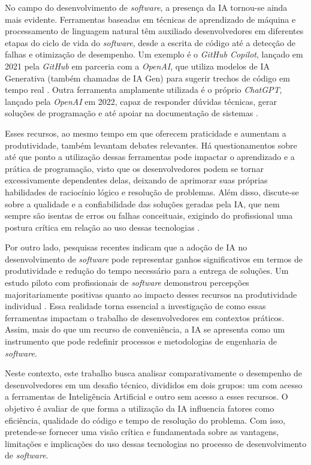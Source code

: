 \documentclass[english,brazilian]{UNISINOSartigo} %
\begin{document}
No campo do desenvolvimento de \textit{software}, a presença da IA tornou-se ainda mais evidente. Ferramentas baseadas em técnicas de aprendizado de máquina e processamento de linguagem natural têm auxiliado desenvolvedores em diferentes etapas do ciclo de vida do \textit{software}, desde a escrita de código até a detecção de falhas e otimização de desempenho. Um exemplo é o \textit{GitHub Copilot}, lançado em 2021 pela \textit{GitHub} em parceria com a \textit{OpenAI}, que utiliza modelos de IA Generativa (também chamadas de IA Gen) para sugerir trechos de código em tempo real \cite{github2021}. Outra ferramenta amplamente utilizada é o próprio \textit{ChatGPT}, lançado pela \textit{OpenAI} em 2022, capaz de responder dúvidas técnicas, gerar soluções de programação e até apoiar na documentação de sistemas \cite{wikipedia2024}.

Esses recursos, ao mesmo tempo em que oferecem praticidade e aumentam a produtividade, também levantam debates relevantes. Há questionamentos sobre até que ponto a utilização dessas ferramentas pode impactar o aprendizado e a prática de programação, visto que os desenvolvedores podem se tornar excessivamente dependentes delas, deixando de aprimorar suas próprias habilidades de raciocínio lógico e resolução de problemas. Além disso, discute-se sobre a qualidade e a confiabilidade das soluções geradas pela IA, que nem sempre são isentas de erros ou falhas conceituais, exigindo do profissional uma postura crítica em relação ao uso dessas tecnologias \cite{rivas2025}.

Por outro lado, pesquisas recentes indicam que a adoção de IA no desenvolvimento de \textit{software} pode representar ganhos significativos em termos de produtividade e redução do tempo necessário para a entrega de soluções. Um estudo piloto com profissionais de \textit{software} demonstrou percepções majoritariamente positivas quanto ao impacto desses recursos na produtividade individual \cite{coutinho2024}. Essa realidade torna essencial a investigação de como essas ferramentas impactam o trabalho de desenvolvedores em contextos práticos. Assim, mais do que um recurso de conveniência, a IA se apresenta como um instrumento que pode redefinir processos e metodologias de engenharia de \textit{software}.

Neste contexto, este trabalho busca analisar comparativamente o desempenho de desenvolvedores em um desafio técnico, divididos em dois grupos: um com acesso a ferramentas de Inteligência Artificial e outro sem acesso a esses recursos. O objetivo é avaliar de que forma a utilização da IA influencia fatores como eficiência, qualidade do código e tempo de resolução do problema. Com isso, pretende-se fornecer uma visão crítica e fundamentada sobre as vantagens, limitações e implicações do uso dessas tecnologias no processo de desenvolvimento de \textit{software}.
\end{document}

